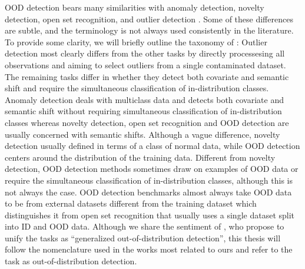 OOD detection bears many similarities with anomaly detection, novelty detection, open set recognition, and outlier detection \parencite{yang_generalized_2022}. 
Some of these differences are subtle, and the terminology is not always used consistently in the literature. To provide some clarity, we will briefly outline the taxonomy of \textcite{yang_generalized_2022}: 
Outlier detection most clearly differs from the other tasks by directly processesing all observations and aiming to select outliers from a single contaminated dataset. 
The remaining tasks differ in whether they detect both covariate and semantic shift and require the simultaneous classification of in-distribution classes. %
Anomaly detection deals with multiclass data and detects both covariate and semantic shift without requiring simultaneous classification of in-distribution classes whereas novelty detection, open set recognition and OOD detection are usually concerned with semantic shifts. 
Although a vague difference, novelty detection usually defined in terms of a class of normal data, while OOD detection centers around the distribution of the training data. Different from novelty detection, OOD detection methods sometimes draw on examples of OOD data or require the simultaneous classification of in-distribution classes, although this is not always the case. 
OOD detection benchmarks almost always take OOD data to be from external datasets different from the training dataset which distinguishes it from open set recognition that usually uses a single dataset split into ID and OOD data. 
Although we share the sentiment of \textcite{yang_generalized_2022}, who propose to unify the tasks as ``generalized out-of-distribution detection'', this thesis will follow the nomenclature used in the works most related to ours and refer to the task as out-of-distribution detection.

